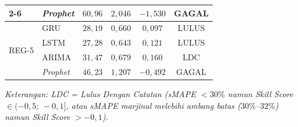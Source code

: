 \begin{table}[htbp]
\begin{tabular}{|p{2.2cm}|p{1.5cm}|c|c|c|c|}
\cline{2-6}
 & \textit{Prophet} & $60{,}96$ & $2{,}046$ & $-1{,}530$ & GAGAL \\
\hline
\multirow{4}{*}{REG-5} & GRU & $28{,}19$ & $0{,}660$ & $0{,}097$ & LULUS \\
\cline{2-6}
 & LSTM & $27{,}28$ & $0{,}643$ & $0{,}121$ & LULUS \\
\cline{2-6}
 & ARIMA & $31{,}47$ & $0{,}679$ & $0{,}160$ & LDC \\
\cline{2-6}
 & \textit{Prophet} & $46{,}23$ & $1{,}207$ & $-0{,}492$ & GAGAL \\
\hline
\end{tabular}
\begin{flushleft}
\footnotesize\textit{Keterangan: LDC = Lulus Dengan Catatan (sMAPE $< 30\%$ namun \textit{Skill Score} $\in (-0{,}5;\ -0{,}1]$, atau sMAPE marjinal melebihi ambang batas ($30\%$--$32\%$) namun \textit{Skill Score} $> -0{,}1$).}
\end{flushleft}
\end{table}
